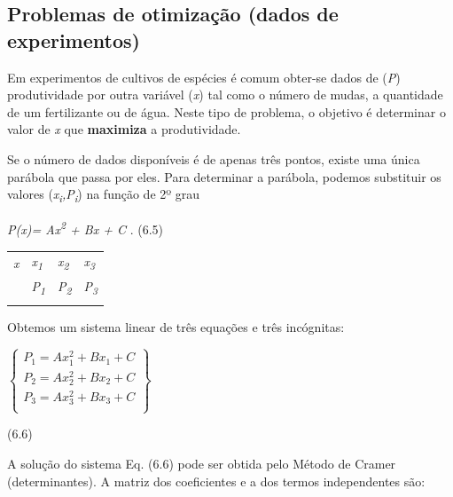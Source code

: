 \subsection{Problemas de otimização (dados de experimentos)}

Em experimentos de cultivos de espécies é comum obter-se dados de (\textit{P}) produtividade por outra variável (\textit{x}) tal como o número de mudas, a quantidade de um fertilizante ou de água. Neste tipo de problema, o objetivo é determinar o valor de \textit{x} que \textbf{maximiza} a produtividade. 

Se o número de dados disponíveis é de apenas três pontos, existe uma única parábola que passa por eles. Para determinar a parábola, podemos substituir os valores (\textit{x\textsubscript{i},P\textsubscript{i}}) na função de 2º grau

\textit{P(x)= Ax\textsuperscript{2} + Bx + C }. \tab (6.5)

\begin{table}[H]
 			\centering
\begin{tabular}{p{0.71in}p{0.71in}p{0.71in}p{0.71in}}
\hline
\multicolumn{1}{|p{0.71in}}{\textit{x}} & 
\multicolumn{1}{|p{0.71in}}{\textit{x\textsubscript{1}}} & 
\multicolumn{1}{|p{0.71in}}{\textit{x\textsubscript{2}}} & 
\multicolumn{1}{|p{0.71in}|}{\textit{x\textsubscript{3}}} \\
\hhline{----}
\multicolumn{1}{|p{0.71in}}{\textit{P}} & 
\multicolumn{1}{|p{0.71in}}{\textit{P\textsubscript{1}}} & 
\multicolumn{1}{|p{0.71in}}{\textit{P\textsubscript{2}}} & 
\multicolumn{1}{|p{0.71in}|}{\textit{P\textsubscript{3}}} \\
\hhline{----}

\end{tabular}
 \end{table}

Obtemos um sistema linear de três equações e três incógnitas:

\begin{multicols}{2}
 \(  \left\{ \begin{matrix}
P_{1}=Ax_{1}^{2}+Bx_{1}+C\\
P_{2}=Ax_{2}^{2}+Bx_{2}+C\\
P_{3}=Ax_{3}^{2}+Bx_{3}+C\\
\end{matrix} \right\} \)

(6.6)
\end{multicols}

A solução do sistema Eq. (6.6) pode ser obtida pelo Método de Cramer (determinantes). A matriz dos coeficientes e a dos termos independentes são:

